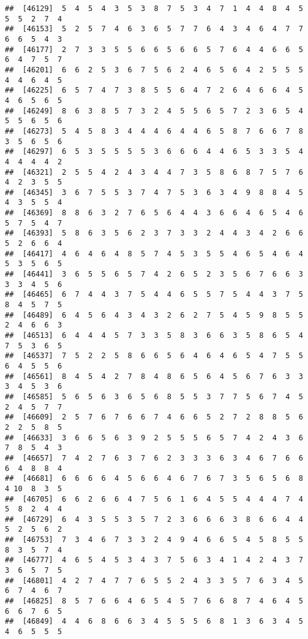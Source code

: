 \documentclass[
]{book}
\begin{document}
\begin{verbatim}
##  [46129]  5  4  5  4  3  5  3  8  7  5  3  4  7  1  4  4  8  4  5  5  5  2  7  4
##  [46153]  5  2  5  7  4  6  3  6  5  7  7  6  4  3  4  6  4  7  7  6  6  5  4  3
##  [46177]  2  7  3  3  5  5  6  6  5  6  6  5  7  6  4  4  6  6  5  6  4  7  5  7
##  [46201]  6  6  2  5  3  6  7  5  6  2  4  6  5  6  4  2  5  5  5  4  4  6  4  5
##  [46225]  6  5  7  4  7  3  8  5  5  6  4  7  2  6  4  6  6  4  5  4  6  5  6  5
##  [46249]  8  6  3  8  5  7  3  2  4  5  5  6  5  7  2  3  6  5  4  5  5  6  5  6
##  [46273]  5  4  5  8  3  4  4  4  6  4  4  6  5  8  7  6  6  7  8  3  5  6  5  6
##  [46297]  6  5  3  5  5  5  5  3  6  6  6  4  4  6  5  3  3  5  4  4  4  4  4  2
##  [46321]  2  5  5  4  2  4  3  4  4  7  3  5  8  6  8  7  5  7  6  4  2  3  5  5
##  [46345]  3  6  7  5  5  3  7  4  7  5  3  6  3  4  9  8  8  4  5  4  3  5  5  4
##  [46369]  8  8  6  3  2  7  6  5  6  4  4  3  6  6  4  6  5  4  6  5  7  5  4  7
##  [46393]  5  8  6  3  5  6  2  3  7  3  3  2  4  4  3  4  2  6  6  5  2  6  6  4
##  [46417]  4  6  4  6  4  8  5  7  4  5  3  5  5  4  6  5  4  6  4  5  3  5  6  5
##  [46441]  3  6  5  5  6  5  7  4  2  6  5  2  3  5  6  7  6  6  3  3  3  4  5  6
##  [46465]  6  7  4  4  3  7  5  4  4  6  5  5  7  5  4  4  3  7  5  8  4  5  7  5
##  [46489]  6  4  5  6  4  3  4  3  2  6  2  7  5  4  5  9  8  5  5  2  4  6  6  3
##  [46513]  6  4  4  4  5  7  3  3  5  8  3  6  6  3  5  8  6  5  4  7  5  3  6  5
##  [46537]  7  5  2  2  5  8  6  6  5  6  4  6  4  6  5  4  7  5  5  6  4  5  5  6
##  [46561]  8  4  5  4  2  7  8  4  8  6  5  6  4  5  6  7  6  3  3  3  4  5  3  6
##  [46585]  5  6  5  6  3  6  5  6  8  5  5  3  7  7  5  6  7  4  5  2  4  5  7  7
##  [46609]  2  5  7  6  7  6  6  7  4  6  6  5  2  7  2  8  8  5  6  2  2  5  8  5
##  [46633]  3  6  6  5  6  3  9  2  5  5  5  6  5  7  4  2  4  3  6  7  8  5  4  3
##  [46657]  7  4  2  7  6  3  7  6  2  3  3  3  6  3  4  6  7  6  6  6  4  8  8  4
##  [46681]  6  6  6  6  4  5  6  6  4  6  7  6  7  3  5  6  5  6  8  4 10  8  3  5
##  [46705]  6  6  2  6  6  4  7  5  6  1  6  4  5  5  4  4  4  7  4  5  8  2  4  4
##  [46729]  6  4  3  5  5  3  5  7  2  3  6  6  6  3  8  6  6  4  4  5  2  5  6  2
##  [46753]  7  3  4  6  7  3  3  2  4  9  4  6  6  5  4  5  8  5  5  8  3  5  7  4
##  [46777]  4  6  5  4  5  3  4  3  7  5  6  3  4  1  4  2  4  3  7  3  6  5  7  5
##  [46801]  4  2  7  4  7  7  6  5  5  2  4  3  3  5  7  6  3  4  5  6  7  4  6  7
##  [46825]  8  5  7  6  6  4  6  5  4  5  7  6  6  8  7  4  6  4  5  6  6  7  6  5
##  [46849]  4  4  6  8  6  6  3  4  5  5  5  6  8  1  3  6  3  4  5  4  6  5  5  5

\end{verbatim}
\end{document}
